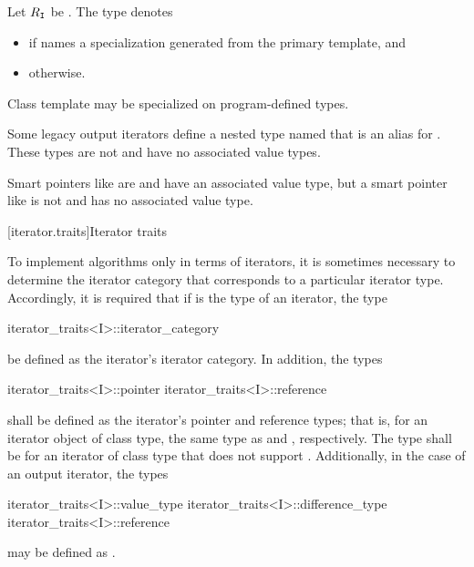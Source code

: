 %
\pnum
Let $R_{\texttt{I}}$ be .
The type  denotes
\begin{itemize}
\item
{}
if  names a specialization
generated from the primary template, and

\item
{} otherwise.
\end{itemize}

\pnum
Class template  may be specialized
on program-defined types.

\pnum
\begin{note}
Some legacy output iterators define a nested type named 
that is an alias for .
These types are not 
and have no associated value types.
\end{note}

\pnum
\begin{note}
Smart pointers like  are  and
have an associated value type, but a smart pointer like 
is not  and has no associated value type.
\end{note}

[iterator.traits]{Iterator traits}

\pnum
{}%
To implement algorithms only in terms of iterators, it is sometimes necessary to
determine the iterator category that corresponds to a particular iterator type.
Accordingly, it is required that if
is the type of an iterator,
the type
%
\begin{codeblock}
iterator_traits<I>::iterator_category
\end{codeblock}
be defined as the iterator's iterator category.
In addition, the types
%
%
\begin{codeblock}
iterator_traits<I>::pointer
iterator_traits<I>::reference
\end{codeblock}
shall be defined as the iterator's pointer and reference types;
that is, for an
iterator object  of class type,
the same type as
 and
,
respectively.
The type
shall be 
for an iterator of class type 
that does not support .
Additionally, in the case of an output iterator, the types
\begin{codeblock}
iterator_traits<I>::value_type
iterator_traits<I>::difference_type
iterator_traits<I>::reference
\end{codeblock}
may be defined as .

